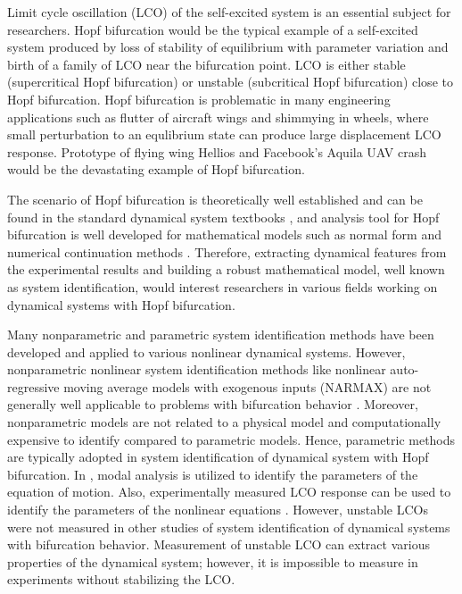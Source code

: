 \documentclass[openacc]{rsproca_new}%
\begin{document}
Limit cycle oscillation (LCO) of the self-excited system is an essential subject for researchers. Hopf bifurcation would be the typical example of a self-excited system produced by loss of stability of equilibrium with parameter variation and birth of a family of LCO near the bifurcation point. LCO is either stable (supercritical Hopf bifurcation) or unstable (subcritical Hopf bifurcation) close to Hopf bifurcation. Hopf bifurcation is problematic in many engineering applications such as flutter of aircraft wings and shimmying in wheels, where small perturbation to an equlibrium state can produce large displacement LCO response. Prototype of flying wing Hellios \cite{noll2004investigation} and Facebook's Aquila UAV crash would be the devastating example of Hopf bifurcation.

The scenario of Hopf bifurcation is theoretically well established and can be found in the standard dynamical system textbooks \cite{kuznetsov2013elements}, and analysis tool for Hopf bifurcation is well developed for mathematical models such as normal form \cite{yu2002simplest,ashwin1995numerical} and numerical continuation methods \cite{doedel2000auto2000,dankowicz2013recipes}. Therefore, extracting dynamical features from the experimental results and building a robust mathematical model, well known as system identification, would interest researchers in various fields working on dynamical systems with Hopf bifurcation.

Many nonparametric and parametric system identification methods have been developed and applied to various nonlinear dynamical systems. However, nonparametric nonlinear system identification methods like nonlinear auto-regressive moving average models with exogenous inputs (NARMAX) are not generally well applicable to problems with bifurcation behavior \cite{thothadri2005nonlinear}. Moreover, nonparametric models are not related to a physical model and computationally expensive to identify compared to parametric models. Hence, parametric methods are typically adopted in system identification of dynamical system with Hopf bifurcation. In \cite{fichera2014experimental}, modal analysis is utilized to identify the parameters of the equation of motion. Also, experimentally measured LCO response can be used to identify the parameters of the nonlinear equations \cite{abdelkefi2013analytical}. However, unstable LCOs were not measured in other studies of system identification of dynamical systems with bifurcation behavior. Measurement of unstable LCO can extract various properties of the dynamical system; however, it is impossible to measure in experiments without stabilizing the LCO.
\end{document}
